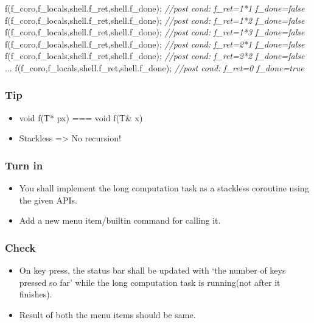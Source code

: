 \documentclass[]{book}
\newenvironment{Shaded}{}{}
\newcommand{\CommentTok}[1]{\textcolor[rgb]{0.50,0.50,0.50}{\textit{{#1}}}}
\newcommand{\NormalTok}[1]{{#1}}
\begin{document}
\begin{Shaded}
\begin{Highlighting}[]
    \NormalTok{f(f_coro,f_locals,shell.f_ret,shell.f_done); }\CommentTok{//post cond: f_ret=1*1  f_done=false}
    \NormalTok{f(f_coro,f_locals,shell.f_ret,shell.f_done); }\CommentTok{//post cond: f_ret=1*2  f_done=false}
    \NormalTok{f(f_coro,f_locals,shell.f_ret,shell.f_done); }\CommentTok{//post cond: f_ret=1*3  f_done=false}
    \NormalTok{f(f_coro,f_locals,shell.f_ret,shell.f_done); }\CommentTok{//post cond: f_ret=2*1  f_done=false}
    \NormalTok{f(f_coro,f_locals,shell.f_ret,shell.f_done); }\CommentTok{//post cond: f_ret=2*2  f_done=false}
    \NormalTok{...}
    \NormalTok{f(f_coro,f_locals,shell.f_ret,shell.f_done); }\CommentTok{//post cond: f_ret=0    f_done=true}
\end{Highlighting}
\end{Shaded}

\subsubsection*{Tip}\label{tip-4}

\begin{itemize}
\itemsep1pt\parskip0pt
\item
  void f(T* px) === void f(T\& x)
\item
  Stackless =\textgreater{} No recursion!
\end{itemize}

\subsubsection*{Turn in}\label{turn-in-4}

\begin{itemize}
\itemsep1pt\parskip0pt
\item
  You shall implement the long computation task as a stackless coroutine
  using the given APIs.
\item
  Add a new menu item/builtin command for calling it.
\end{itemize}

\subsubsection*{Check}\label{check-4}

\begin{itemize}
\itemsep1pt\parskip0pt
\item
  On key press, the status bar shall be updated with `the number of keys
  pressed so far' while the long computation task is running(not after
  it finishes).
\item
  Result of both the menu items should be same.
\end{itemize}
\end{document}
